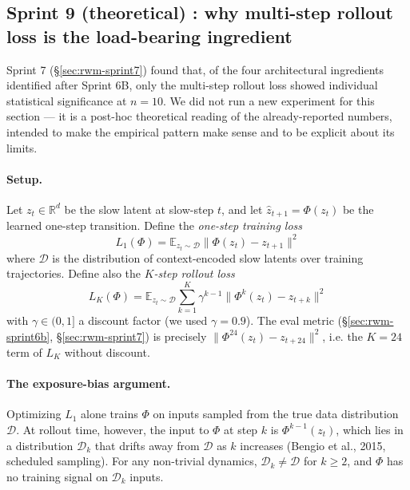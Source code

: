 \documentclass[11pt,a4paper]{article}
\begin{document}
\subsection{Sprint 9 (theoretical) : why multi-step rollout loss is
the load-bearing ingredient}
\label{sec:rwm-sprint9-theory}

Sprint 7 (\S\ref{sec:rwm-sprint7}) found that, of the four
architectural ingredients identified after Sprint 6B, only the
multi-step rollout loss showed individual statistical
significance at $n {=} 10$. We did not run a new experiment for
this section --- it is a post-hoc theoretical reading of the
already-reported numbers, intended to make the empirical pattern
make sense and to be explicit about its limits.

\paragraph{Setup.} Let $z_t \in \mathbb{R}^d$ be the slow latent
at slow-step $t$, and let $\hat{z}_{t+1} = \Phi(z_t)$ be the
learned one-step transition. Define the
\emph{one-step training loss}
\[
L_1(\Phi) = \mathbb{E}_{z_t \sim \mathcal{D}}
  \bigl\| \Phi(z_t) - z_{t+1} \bigr\|^2
\]
where $\mathcal{D}$ is the distribution of context-encoded
slow latents over training trajectories. Define also the
\emph{$K$-step rollout loss}
\[
L_K(\Phi) = \mathbb{E}_{z_t \sim \mathcal{D}}
  \sum_{k=1}^{K} \gamma^{k-1}
  \bigl\| \Phi^k(z_t) - z_{t+k} \bigr\|^2
\]
with $\gamma \in (0,1]$ a discount factor (we used $\gamma{=}0.9$).
The eval metric (\S\ref{sec:rwm-sprint6b}, \S\ref{sec:rwm-sprint7})
is precisely $\bigl\| \Phi^{24}(z_t) - z_{t+24} \bigr\|^2$,
i.e. the $K{=}24$ term of $L_K$ without discount.

\paragraph{The exposure-bias argument.} Optimizing $L_1$ alone
trains $\Phi$ on inputs sampled from the true data
distribution $\mathcal{D}$. At rollout time, however, the input
to $\Phi$ at step $k$ is $\Phi^{k-1}(z_t)$, which lies in a
distribution $\mathcal{D}_k$ that drifts away from $\mathcal{D}$
as $k$ increases (Bengio et al., 2015, scheduled sampling). For
any non-trivial dynamics, $\mathcal{D}_k \neq \mathcal{D}$ for
$k \geq 2$, and $\Phi$ has no training signal on $\mathcal{D}_k$
inputs.
\end{document}
